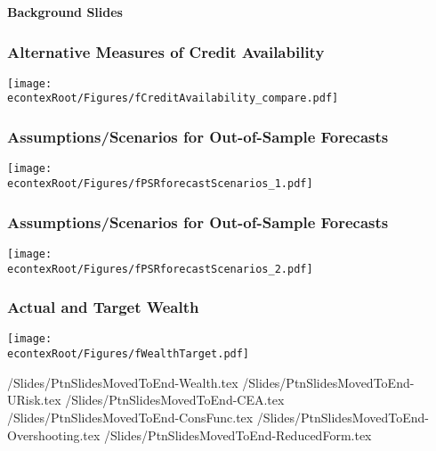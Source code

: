 \documentclass[pdflatex]{beamer}
\newcommand{\remph}[1]{{\textbf{\color{myRed}#1}}}
\begin{document}
                                         \begin{frame}
                                           \Large\remph{Background Slides}
                                         \end{frame}


                                         \begin{frame}\frametitle{\textbf{Alternative Measures of Credit Availability}}
                                           \texttt{[image: \\econtexRoot/Figures/fCreditAvailability\_compare.pdf]}
                                         \end{frame}


                                         \begin{frame}\frametitle{\textbf{Assumptions/Scenarios for Out-of-Sample Forecasts}}
                                           \texttt{[image: \\econtexRoot/Figures/fPSRforecastScenarios\_1.pdf]}
                                         \end{frame}


                                         \begin{frame}\frametitle{\textbf{Assumptions/Scenarios for Out-of-Sample Forecasts}}
                                           \texttt{[image: \\econtexRoot/Figures/fPSRforecastScenarios\_2.pdf]}
                                         \end{frame}

                                         \begin{frame}\frametitle{\textbf{Actual and Target Wealth}}
                                           \texttt{[image: \\econtexRoot/Figures/fWealthTarget.pdf]}
                                         \end{frame}


                                          {\econtexRoot/Slides/PtnSlidesMovedToEnd-Wealth.tex}
                                          {\econtexRoot/Slides/PtnSlidesMovedToEnd-URisk.tex}
                                          {\econtexRoot/Slides/PtnSlidesMovedToEnd-CEA.tex}
                                          \econtexRoot/Slides/PtnSlidesMovedToEnd-ConsFunc.tex
                                          \econtexRoot/Slides/PtnSlidesMovedToEnd-Overshooting.tex
                                          \econtexRoot/Slides/PtnSlidesMovedToEnd-ReducedForm.tex

                                       
\end{document}
